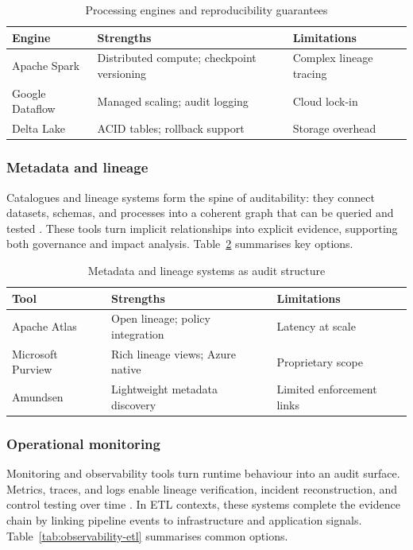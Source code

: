 \begin{table}[h]
  \centering
  \caption{Processing engines and reproducibility guarantees}
  \label{tab:engines}
  \begin{tabular}{@{}lll@{}}
    \toprule
    Engine & Strengths & Limitations \\
    \midrule
    Apache Spark& Distributed compute; checkpoint versioning & Complex lineage tracing \\
    Google Dataflow & Managed scaling; audit logging & Cloud lock-in \\
    Delta Lake & ACID tables; rollback support & Storage overhead \\
    \bottomrule
  \end{tabular}
\end{table}


\subsubsection*{Metadata and lineage}
Catalogues and lineage systems form the spine of auditability: they connect
datasets, schemas, and processes into a coherent graph that can be queried and
tested \cite{elbaghazaoui_metadata_2025, yang_impact_2025}. These tools turn
implicit relationships into explicit evidence, supporting both governance and
impact analysis. Table~\ref{tab:metadata} summarises key options.

\begin{table}[h]
  \centering
  \caption{Metadata and lineage systems as audit structure}
  \label{tab:metadata}
  \begin{tabular}{@{}lll@{}}
    \toprule
    Tool & Strengths & Limitations \\
    \midrule
    Apache Atlas & Open lineage; policy integration & Latency at scale \\
    Microsoft Purview & Rich lineage views; Azure native & Proprietary scope \\
    Amundsen & Lightweight metadata discovery & Limited enforcement links \\
    \bottomrule
  \end{tabular}
\end{table}


\subsubsection*{Operational monitoring}
Monitoring and observability tools turn runtime behaviour into an audit
surface. Metrics, traces, and logs enable lineage verification, incident
reconstruction, and control testing over time \cite{sreepathy_data_2024}. In
ETL contexts, these systems complete the evidence chain by linking pipeline
events to infrastructure and application signals.
Table~\ref{tab:observability-etl} summarises common options.

